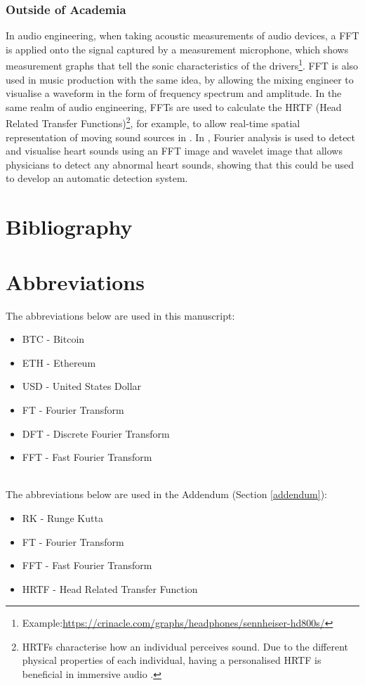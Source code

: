 \documentclass[a4paper, 10pt, conference]{ieeeconf}      %
\begin{document}
\subsubsection{Outside of Academia} %
In audio engineering, when taking acoustic measurements of audio devices, a FFT is applied onto the signal captured by a measurement microphone, which shows measurement graphs that tell the sonic characteristics of the drivers\footnote{Example:\url{https://crinacle.com/graphs/headphones/sennheiser-hd800s/}}. FFT is also used in music production with the same idea, by allowing the mixing engineer to visualise a waveform in the form of frequency spectrum and amplitude. In the same realm of audio engineering, FFTs are used to calculate the HRTF (Head Related Transfer Functions)\footnote{HRTFs characterise how an individual perceives sound. Due to the different physical properties of each individual, having a personalised HRTF is beneficial in immersive audio \cite{Oehler2023}.}, for example, to allow real-time spatial representation of moving sound sources in \cite{Tsakostas2007}.  In \cite{Nogata2012}, Fourier analysis is used to detect and visualise heart sounds using an FFT image and wavelet image that allows physicians to detect any abnormal heart sounds, showing that this could be used to develop an automatic detection system. 


\newpage
\section{Bibliography}


\section{Abbreviations}
The abbreviations below are used in this manuscript:
\begin{itemize}
    \item BTC - Bitcoin
    \item ETH - Ethereum
    \item USD - United States Dollar
    \item FT - Fourier Transform
    \item DFT - Discrete Fourier Transform
    \item FFT - Fast Fourier Transform
\end{itemize}
\\
The abbreviations below are used in the Addendum (Section \ref{addendum}):
\begin{itemize}
    \item RK - Runge Kutta
    \item FT - Fourier Transform
    \item FFT - Fast Fourier Transform
    \item HRTF - Head Related Transfer Function
\end{itemize}
\end{document}
